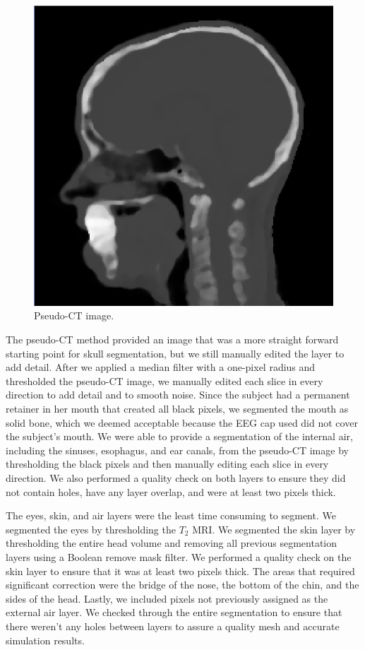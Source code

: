 \begin{figure}[H]
\begin{center}
\includegraphics[width=.64\textwidth]{Figures/pseudo_CT}
\caption{Pseudo-CT image.}
\label{fig:ct}
\end{center}
\end{figure}

The pseudo-CT method provided an image that was a more straight forward starting point for skull segmentation, but we still manually edited the layer to add detail. After we applied a median filter with a one-pixel radius and thresholded the pseudo-CT image, we manually edited each slice in every direction to add detail and to smooth noise. Since the subject had a permanent retainer in her mouth that created all black pixels, we segmented the mouth as solid bone, which we deemed acceptable because the EEG cap used did not cover the subject's mouth. We were able to provide a segmentation of the internal air, including the sinuses, esophagus, and ear canals, from the pseudo-CT image by thresholding the black pixels and then manually editing each slice in every direction. We also performed a quality check on both layers to ensure they did not contain holes, have any layer overlap, and were at least two pixels thick.

The eyes, skin, and air layers were the least time consuming to segment. We segmented the eyes by thresholding the $T_2$ MRI. We segmented the skin layer by thresholding the entire head volume and removing all previous segmentation layers using a Boolean remove mask filter. We performed a quality check on the skin layer to ensure that it was at least two pixels thick. The areas that required significant correction were the bridge of the nose, the bottom of the chin, and the sides of the head. Lastly, we included pixels not previously assigned as the external air layer. We checked through the entire segmentation to ensure that there weren't any holes between layers to assure a quality mesh and accurate simulation results. 

